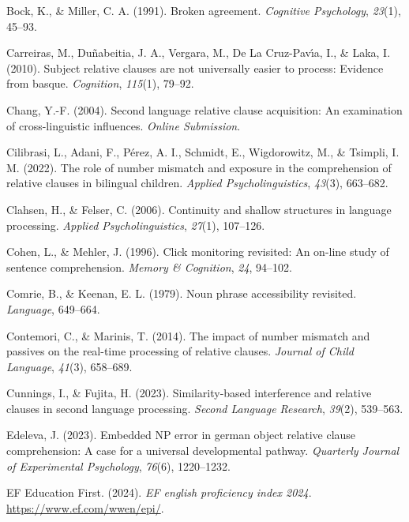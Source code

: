 \documentclass[
]{article}
\newlength{\cslhangindent}
\newenvironment{CSLReferences}[2] %
 {\begin{list}{}{%
  \setlength{\itemindent}{0pt}
  \setlength{\leftmargin}{0pt}
  \setlength{\parsep}{0pt}
  \ifodd #1
   \setlength{\leftmargin}{\cslhangindent}
   \setlength{\itemindent}{-1\cslhangindent}
  \fi
  \setlength{\itemsep}{#2\baselineskip}}}
 {\end{list}}
\begin{document}
\begin{CSLReferences}{1}{0}
Bock, K., \& Miller, C. A. (1991). Broken agreement. \emph{Cognitive
Psychology}, \emph{23}(1), 45--93.

Carreiras, M., Duñabeitia, J. A., Vergara, M., De La Cruz-Pavı́a, I., \&
Laka, I. (2010). Subject relative clauses are not universally easier to
process: Evidence from basque. \emph{Cognition}, \emph{115}(1), 79--92.

Chang, Y.-F. (2004). Second language relative clause acquisition: An
examination of cross-linguistic influences. \emph{Online Submission}.

Cilibrasi, L., Adani, F., Pérez, A. I., Schmidt, E., Wigdorowitz, M., \&
Tsimpli, I. M. (2022). The role of number mismatch and exposure in the
comprehension of relative clauses in bilingual children. \emph{Applied
Psycholinguistics}, \emph{43}(3), 663--682.

Clahsen, H., \& Felser, C. (2006). Continuity and shallow structures in
language processing. \emph{Applied Psycholinguistics}, \emph{27}(1),
107--126.

Cohen, L., \& Mehler, J. (1996). Click monitoring revisited: An on-line
study of sentence comprehension. \emph{Memory \& Cognition}, \emph{24},
94--102.

Comrie, B., \& Keenan, E. L. (1979). Noun phrase accessibility
revisited. \emph{Language}, 649--664.

Contemori, C., \& Marinis, T. (2014). The impact of number mismatch and
passives on the real-time processing of relative clauses. \emph{Journal
of Child Language}, \emph{41}(3), 658--689.

Cunnings, I., \& Fujita, H. (2023). Similarity-based interference and
relative clauses in second language processing. \emph{Second Language
Research}, \emph{39}(2), 539--563.

Edeleva, J. (2023). Embedded NP error in german object relative clause
comprehension: A case for a universal developmental pathway.
\emph{Quarterly Journal of Experimental Psychology}, \emph{76}(6),
1220--1232.

EF Education First. (2024). \emph{EF english proficiency index 2024}.
\url{https://www.ef.com/wwen/epi/}.


\end{CSLReferences}
\end{document}
